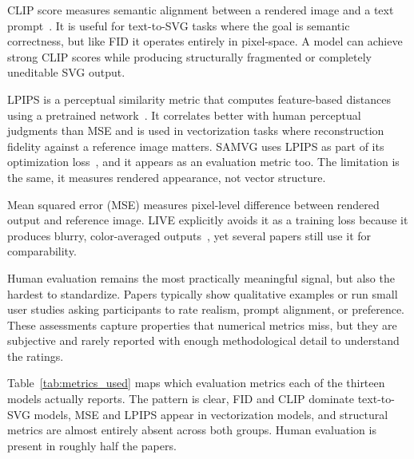 CLIP score measures semantic alignment between a rendered 
image and a text 
prompt~\cite{radfordLearningTransferableVisual2021}. It is useful for 
text-to-SVG tasks where the goal is semantic correctness, 
but like FID it operates entirely in pixel-space. A model 
can achieve strong CLIP scores while producing structurally 
fragmented or completely uneditable SVG output.

LPIPS is a perceptual similarity metric that 
computes feature-based distances using a pretrained 
network~\cite{zhangUnreasonableEffectivenessDeep2018}. 
It correlates better with human perceptual judgments than 
MSE and is used in vectorization tasks where reconstruction 
fidelity against a reference image matters. SAMVG uses LPIPS 
as part of its optimization 
loss~\cite{zhuSAMVGMultistageImage2023}, and it appears as 
an evaluation metric too. The 
limitation is the same, it measures rendered appearance, 
not vector structure.

Mean squared error (MSE) measures pixel-level difference between
rendered output and reference image. LIVE explicitly avoids it as 
a training loss because it produces blurry, color-averaged 
outputs~\cite{maLayerwiseImageVectorization2022}, yet several
papers still use it for comparability.

Human evaluation remains the most practically 
meaningful signal, but also the hardest to standardize. 
Papers typically show qualitative examples or run 
small user studies asking participants to rate realism, 
prompt alignment, or preference. These assessments capture 
properties that numerical metrics miss, but they are 
subjective and rarely reported 
with enough methodological detail to understand the ratings.

Table~\ref{tab:metrics_used} maps which evaluation metrics
each of the thirteen models actually reports. The 
pattern is clear, FID and CLIP dominate text-to-SVG models, 
MSE and LPIPS appear in vectorization models, and structural 
metrics are almost entirely absent across both groups. 
Human evaluation is present in roughly half the papers.


